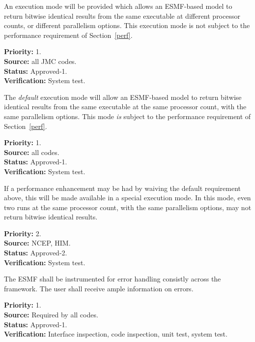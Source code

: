 
An execution mode will be provided which allows an ESMF-based model to
return bitwise identical results from the same executable at different
processor counts, or different parallelism options. This execution
mode is not subject to the performance requirement of Section~\ref{perf}.

\begin{reqlist}
{\bf Priority:} 1. \\
{\bf Source:} all JMC codes. \\
{\bf Status:} Approved-1. \\
{\bf Verification:} System test.
\end{reqlist}


The \emph{default} execution mode will allow an ESMF-based model to
return bitwise identical results from the same executable at the same
processor count, with the same parallelism options. This mode
\emph{is} subject to the performance requirement of
Section~\ref{perf}.

\begin{reqlist}
{\bf Priority:} 1. \\
{\bf Source:} all codes. \\
{\bf Status:} Approved-1. \\
{\bf Verification:} System test.
\end{reqlist}


If a performance enhancement may be had by waiving the default
requirement above, this will be made available in a special execution
mode. In this mode, even two runs at the same processor count, with
the same parallelism options, may not return bitwise identical
results.

\begin{reqlist}
{\bf Priority:} 2. \\
{\bf Source:} NCEP, HIM. \\
{\bf Status:} Approved-2. \\
{\bf Verification:} System test.
\end{reqlist}

The ESMF shall be instrumented for error handling consistly across the
framework.  The user shall receive ample information on errors.
\begin{reqlist}
  {\bf Priority:} 1. \\
  {\bf Source:} Required by all codes. \\
  {\bf Status:} Approved-1. \\
  {\bf Verification:} Interface inspection, code inspection, unit
  test, system test.
\end{reqlist}

